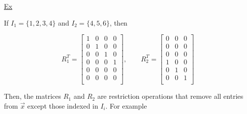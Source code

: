 \underline{Ex}

If $I_1=\{ 1, 2, 3, 4 \}$ and  $I_2 = \{ 4, 5, 6 \}$, then

\begin{equation*}
    R_1^T =
    \begin{bmatrix}
            1 & 0 & 0 & 0 \\
            0 & 1 & 0 & 0 \\
            0 & 0 & 1 & 0 \\
            0 & 0 & 0 & 1 \\
            0 & 0 & 0 & 0 \\
            0 & 0 & 0 & 0 \\
    \end{bmatrix},
    \qquad
    R_2^T =
    \begin{bmatrix}
            0 & 0 & 0 \\
            0 & 0 & 0 \\
            0 & 0 & 0 \\
            1 & 0 & 0 \\
            0 & 1 & 0 \\
            0 & 0 & 1 \\
    \end{bmatrix}
\end{equation*}

Then, the matrices $R_1$ and $R_2$ are restriction operations that remove all entries from $\vec{x}$ except those indexed in $I_i$. For example

